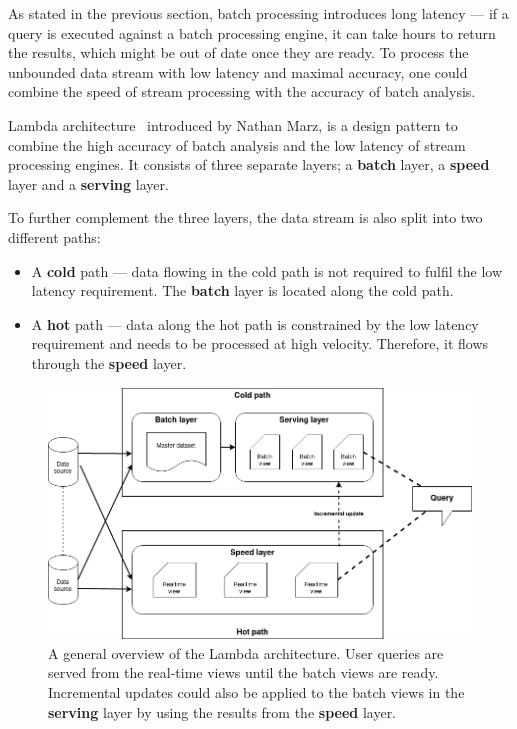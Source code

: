 As stated in the previous section, batch processing introduces long latency --- if a query 
is executed against a batch processing engine, it can take hours to return the results, which might be 
out of date once they are ready. To process the unbounded data stream with low latency and maximal accuracy,
one could combine the speed of stream processing with the accuracy of batch analysis. 


Lambda architecture~\cite{lambda_arch, lambda_arch_book, lambda_arc_bpost} introduced by Nathan Marz, is a 
design pattern to combine the high accuracy of batch analysis and the low latency of 
stream processing engines. It consists of three separate layers; a \textbf{batch} layer, 
a \textbf{speed} layer and a \textbf{serving} layer. 

To further complement the three layers, 
the data stream is also split into two different paths: 
\begin{itemize}
    \item A \textbf{cold} path --- data flowing in the cold path is not required to fulfil the low
        latency requirement. The \textbf{batch} layer is located along the cold path.   
    \item A \textbf{hot} path --- data along the hot path is constrained by the low latency requirement 
        and needs to be processed at high velocity. Therefore, it flows through the 
        \textbf{speed} layer.  
\end{itemize}

\begin{figure}[!htpb]
    \centering
    \includegraphics[width=\linewidth]{fig/lambda_arch.png}
    \caption{A general overview of the Lambda architecture. User queries are served from 
    the real-time views until the batch views are ready. Incremental updates could also be applied 
to the batch views in the \textbf{serving} layer by using the results from the \textbf{speed} layer.
~\cite{lambda_arch_book}}%
    \label{fig:lambda_arch}
\end{figure}


